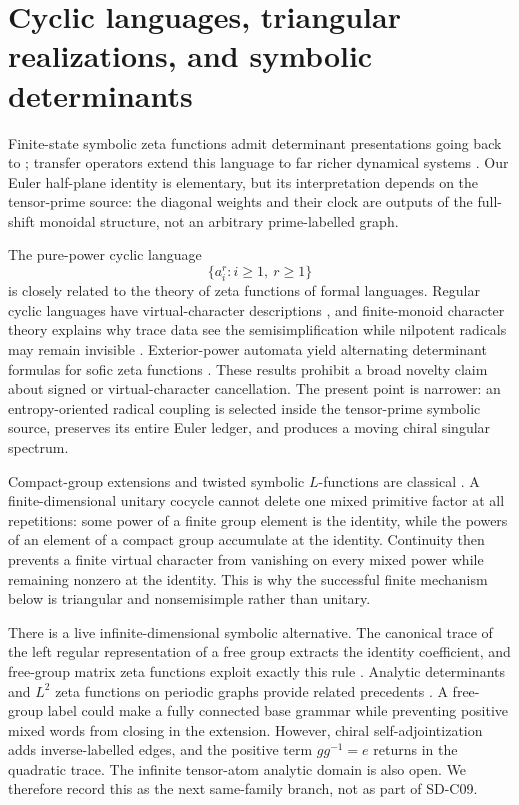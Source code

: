 \section{Cyclic languages, triangular realizations, and symbolic determinants}
\label{sec:related}

Finite-state symbolic zeta functions admit determinant presentations going
back to \citet{bowenlanford1970}; transfer operators extend this language to
far richer dynamical systems \citep{ruelle1976}.  Our Euler half-plane
identity is elementary, but its interpretation depends on the tensor-prime
source: the diagonal weights and their clock are outputs of the full-shift
monoidal structure, not an arbitrary prime-labelled graph.

The pure-power cyclic language
\[
 \{a_i^r:i\ge1,\ r\ge1\}
\]
is closely related to the theory of zeta functions of formal languages.
Regular cyclic languages have virtual-character descriptions
\citep{berstelreutenauer1990}, and finite-monoid character theory explains
why trace data see the semisimplification while nilpotent radicals may remain
invisible \citep{masudaquoossteinberg2015}.  Exterior-power automata yield
alternating determinant formulas for sofic zeta functions
\citep{beal1995}.  These results prohibit a broad novelty claim about signed
or virtual-character cancellation.  The present point is narrower: an
entropy-oriented radical coupling is selected inside the tensor-prime
symbolic source, preserves its entire Euler ledger, and produces a moving
chiral singular spectrum.

Compact-group extensions and twisted symbolic $L$-functions are classical
\citep{parrypollicott1990}.  A finite-dimensional unitary cocycle cannot
delete one mixed primitive factor at all repetitions: some power of a finite
group element is the identity, while the powers of an element of a compact
group accumulate at the identity.  Continuity then prevents a finite virtual
character from vanishing on every mixed power while remaining nonzero at the
identity.  This is why the successful finite mechanism below is triangular
and nonsemisimple rather than unitary.

There is a live infinite-dimensional symbolic alternative.  The canonical
trace of the left regular representation of a free group extracts the
identity coefficient, and free-group matrix zeta functions exploit exactly
this rule \citep{kasselreutenauer2014}.  Analytic determinants and $L^2$
zeta functions on periodic graphs provide related precedents
\citep{clairmokhtari2002,guidoisolalapidus2009}.  A free-group label could
make a fully connected base grammar while preventing positive mixed words
from closing in the extension.  However, chiral self-adjointization adds
inverse-labelled edges, and the positive term $gg^{-1}=e$ returns in the
quadratic trace.  The infinite tensor-atom analytic domain is also open.  We
therefore record this as the next same-family branch, not as part of SD-C09.


